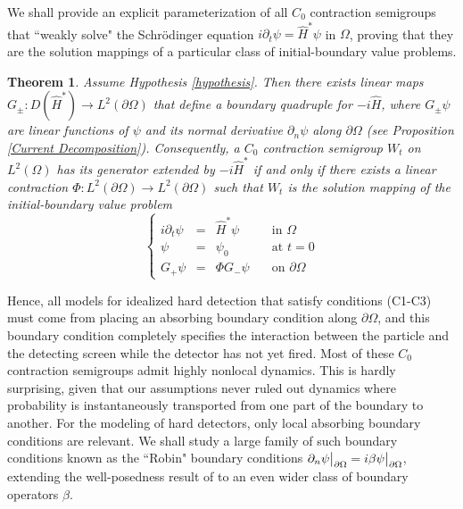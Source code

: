 \documentclass{article}
\numberwithin{equation}{section}
\newtheorem{theoremmain}{Theorem}
\begin{document}
We shall provide an explicit parameterization of all $C_0$ contraction semigroups that ``weakly solve" the Schr\"odinger equation $i\partial_t\psi=\hat{H}^*\psi$ in $\Omega$, proving that they are the solution mappings of a particular class of initial-boundary value problems. 
\begin{theoremmain}\label{main}
    Assume Hypothesis \ref{hypothesis}. Then there exists linear maps $G_\pm:D(\hat{H}^*)\to L^2(\partial \Omega)$ that define a boundary quadruple for $-i\hat{H}$, where $G_\pm \psi$ are linear functions of $\psi$ and its normal derivative $\partial_n \psi$ along $\partial \Omega$ (see Proposition \ref{Current Decomposition}). Consequently, a $C_0$ contraction semigroup $W_t$ on $L^2(\Omega)$ has its generator extended by $-i\hat{H}^*$ if and only if there exists a linear contraction $\Phi:L^2(\partial\Omega)\to L^2(\partial \Omega)$ such that $W_t$ is the solution mapping of the initial-boundary value problem
    \em \begin{equation}\label{main gen IBVP}
\left\{\begin{array}{rclr}
       i \partial_t \psi&=& \hat{H}^* \psi \quad &\text{in } \Omega
       \\
       \psi &=&\psi_0 \quad &\text{at } t=0
       \\
       G_+\psi&=&\Phi G_-\psi \quad &\text{on } \partial \Omega
    \end{array}
    \right.
    \end{equation}
\end{theoremmain}
Hence, all models for idealized hard detection that satisfy conditions (C1-C3) must come from placing an absorbing boundary condition along $\partial \Omega$, and this boundary condition completely specifies the interaction between the particle and the detecting screen while the detector has not yet fired. Most of these $C_0$ contraction semigroups admit highly nonlocal dynamics. This is hardly surprising, given that our assumptions never ruled out dynamics where probability is instantaneously transported from one part of the boundary to another. For the modeling of hard detectors, only local absorbing boundary conditions are relevant. We shall study a large family of such boundary conditions known as the ``Robin" boundary conditions $\partial_n\psi \big{|}_{\partial \Omega}=i\beta \psi \big{|}_{\partial \Omega}$, extending the well-posedness result of \cite{Existence} to an even wider class of boundary operators $\beta$.
\end{document}
